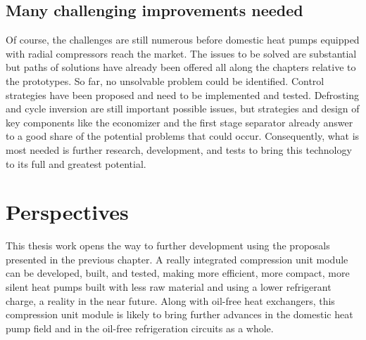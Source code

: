 \vspace{1em}

\subsection{Many challenging improvements needed}
\label{sec:concl-improvements}

Of course, the challenges are still numerous before domestic heat
pumps equipped with radial compressors reach the market. The issues to
be solved are substantial but paths of solutions have already been
offered all along the chapters relative to the prototypes. So far, no
unsolvable problem could be identified. Control strategies have been
proposed and need to be implemented and tested. Defrosting and cycle
inversion are still important possible issues, but strategies and
design of key components like the economizer and the first stage
separator already answer to a good share of the potential problems
that could occur. Consequently, what is most needed is further
research, development, and tests to bring this technology to its full
and greatest potential.

\vspace{1em}

\section{Perspectives}
\label{sec:perspectives}

This thesis work opens the way to further development using the
proposals presented in the previous chapter. A really integrated
compression unit module can be developed, built, and tested, making
more efficient, more compact, more silent heat pumps built with less
raw material and using a lower refrigerant charge, a reality in the
near future. Along with oil-free heat exchangers, this compression
unit module is likely to bring further advances in the domestic heat
pump field and in the oil-free refrigeration circuits as a whole.
